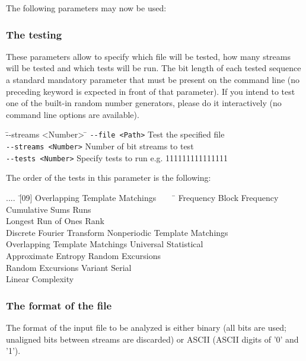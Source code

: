 \documentclass[12pt]{article}
\begin{document}
\medskip
The following parameters may now be used:

\subsubsection*{The testing}
These parameters allow to specify which file will be tested, how many streams will be tested and which tests will be run. The bit length of each tested sequence a standard mandatory parameter that must be present on the command line (no preceding keyword is expected in front of that parameter). If you intend to test one of the built-in random number generators, please do it interactively (no command line options are available).

\begin{tabbing}
\= --streams <Number>\hspace{40mm} \= \kill
\>\verb|--file <Path>|                 \>Test the specified file\\
\>\verb|--streams <Number>|            \>Number of bit streams to test\\
\>\verb|--tests <Number>|              \>Specify tests to run e.g. 111111111111111
\end{tabbing}

\newpage
The order of the tests in this parameter is the following:

\begin{tabbing}
....\ \= [09] Overlapping Template Matchings \ \ \ \ \= \kill
    \>[01] Frequency                       \>[02] Block Frequency\\
    \>[03] Cumulative Sums                 \>[04] Runs\\
    \>[05] Longest Run of Ones             \>[06] Rank\\
    \>[07] Discrete Fourier Transform      \>[08] Nonperiodic Template Matchings\\
    \>[09] Overlapping Template Matchings  \>[10] Universal Statistical\\
    \>[11] Approximate Entropy             \>[12] Random Excursions\\
    \>[13] Random Excursions Variant       \>[14] Serial\\
    \>[15] Linear Complexity
\end{tabbing}

\subsubsection*{The format of the file}
The format of the input file to be analyzed is either binary (all bits are used; unaligned bits between streams are discarded) or ASCII (ASCII digits of '0' and '1').
\end{document}
